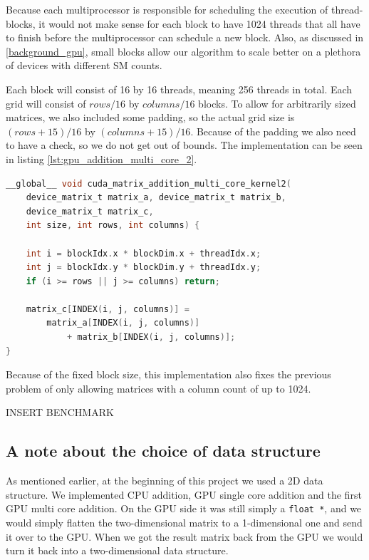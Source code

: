 Because each multiprocessor is responsible for scheduling the execution of thread-blocks, it would not make sense for each block to have 1024 threads that all have to finish before the multiprocessor can schedule a new block. Also, as discussed in \ref{background_gpu}, small blocks allow our algorithm to scale better on a plethora of devices with different SM counts.

Each block will consist of 16 by 16 threads, meaning 256 threads in total. Each grid will consist of $rows / 16$ by $columns / 16$ blocks. To allow for arbitrarily sized matrices, we also included some padding, so the actual grid size is $(rows + 15) / 16$ by $(columns + 15) / 16$. Because of the padding we also need to have a check, so we do not get out of bounds. The implementation can be seen in listing \ref{lst:gpu_addition_multi_core_2}.

\begin{lstlisting}[language=C, caption={GPU addition multi core 2}, label={lst:gpu_addition_multi_core_2}]
__global__ void cuda_matrix_addition_multi_core_kernel2(
    device_matrix_t matrix_a, device_matrix_t matrix_b,
    device_matrix_t matrix_c, 
    int size, int rows, int columns) {
    
    int i = blockIdx.x * blockDim.x + threadIdx.x;
    int j = blockIdx.y * blockDim.y + threadIdx.y;
    if (i >= rows || j >= columns) return;

    matrix_c[INDEX(i, j, columns)] =
        matrix_a[INDEX(i, j, columns)] 
            + matrix_b[INDEX(i, j, columns)];
}
\end{lstlisting}

Because of the fixed block size, this implementation also fixes the previous problem of only allowing matrices with a column count of up to 1024.

INSERT BENCHMARK

\subsection{A note about the choice of data structure}

As mentioned earlier, at the beginning of this project we used a 2D data structure. We implemented CPU addition, GPU single core addition and the first GPU multi core addition. On the GPU side it was still simply a \texttt{float *}, and we would simply flatten the two-dimensional matrix to a 1-dimensional one and send it over to the GPU. When we got the result matrix back from the GPU we would turn it back into a two-dimensional data structure. 

